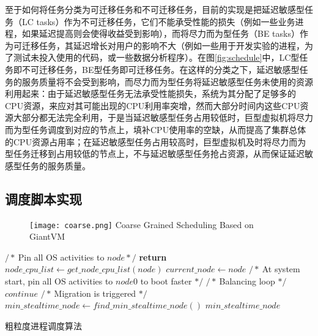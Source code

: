至于如何将任务分类为可迁移任务和不可迁移任务，目前的实现是把延迟敏感型任务（LC tasks）作为不可迁移任务，它们不能承受性能的损失（例如一些业务进程，如果延迟提高则会使得收益受到影响），而将尽力而为型任务（BE tasks）作为可迁移任务，其延迟增长对用户的影响不大（例如一些用于开发实验的进程，为了测试未投入使用的代码，或一些数据分析程序）。在图\ref{fig:schedule}中，LC型任务即不可迁移任务，BE型任务即可迁移任务。在这样的分类之下，延迟敏感型任务的服务质量将不会受到影响，而尽力而为型任务将延迟敏感型任务未使用的资源利用起来：由于延迟敏感型任务无法承受性能损失，系统为其分配了足够多的CPU资源，来应对其可能出现的CPU利用率突增，然而大部分时间内这些CPU资源大部分都无法完全利用，于是当延迟敏感型任务占用较低时，巨型虚拟机将尽力而为型任务调度到对应的节点上，填补CPU使用率的空缺，从而提高了集群总体的CPU资源占用率；在延迟敏感型任务占用较高时，巨型虚拟机及时将尽力而为型任务迁移到占用较低的节点上，不与延迟敏感型任务抢占资源，从而保证延迟敏感型任务的服务质量。

\subsection{调度脚本实现}

\begin{figure}[!htp]
  \centering
  \texttt{[image: coarse.png]}
    {Coarse Grained Scheduling Based on GiantVM}
  \label{fig:coarsed}
\end{figure}

\begin{algorithm}[h]
\begin{algorithmic}[1]
\State $/*\ $Pin all OS activities to $node */$
\State \textbf{return}
\EndIf
\State $node\_cpu\_list \gets get\_node\_cpu\_list(node)$
\State
{}
\State
{}
\State
{}
\EndFor
\State $current\_node \gets node$
\EndFunction
\State
\State $/*\ $At system start, pin all OS activities to $node0$ to boot faster $*/$
\State
{}
\State
\State $/*\ $Balancing loop $*/$
\State
{}
\State $continue$
\EndIf
\State $/*\ $Migration is triggered $*/$
\State $min\_stealtime\_node \gets find\_min\_stealtime\_node()$
\State
{} {$min\_stealtime\_node$}
\EndWhile
\end{algorithmic}
\caption{粗粒度进程调度算法}
\label{algo:coarse}
\end{algorithm}

